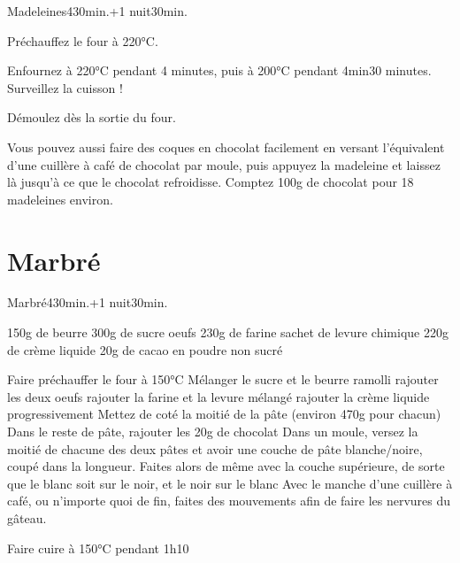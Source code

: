{\begin{recette}{Madeleines}{4}{30min.+1 nuit}{30min.}
\begin{cuisson}
Préchauffez le four à 220°C. 

Enfournez à 220°C pendant 4 minutes, puis à 200°C pendant 4min30 minutes. Surveillez la cuisson !

Démoulez dès la sortie du four.

\begin{remarque}
Vous pouvez aussi faire des coques en chocolat facilement en versant l'équivalent d'une cuillère à café de chocolat par moule, puis appuyez la madeleine et laissez là jusqu'à ce que le chocolat refroidisse. Comptez 100g de chocolat pour 18 madeleines environ.
\end{remarque}

\end{cuisson}
\end{recette}


\section{Marbré}
\begin{recette}{Marbré}{4}{30min.+1 nuit}{30min.}
\begin{ingredients}
\ingredient 150g de beurre
\ingredient 300g de sucre
 oeufs
\ingredient 230g de farine
 sachet de levure chimique
\ingredient 220g de crème liquide
\ingredient 20g de cacao en poudre non sucré
\end{ingredients}

\begin{preparation}
\etape Faire préchauffer le four à 150°C
\etape Mélanger le sucre et le beurre ramolli
\etape rajouter les deux oeufs
\etape rajouter la farine et la levure mélangé
\etape rajouter la crème liquide progressivement
\etape Mettez de coté la moitié de la pâte (environ 470g pour chacun)
\etape Dans le reste de pâte, rajouter les 20g de chocolat
\etape Dans un moule, versez la moitié de chacune des deux pâtes et avoir une couche de pâte blanche/noire, coupé dans la longueur.
\etape Faites alors de même avec la couche supérieure, de sorte que le blanc soit sur le noir, et le noir sur le blanc
\etape Avec le manche d'une cuillère à café, ou n'importe quoi de fin, faites des mouvements afin de faire les nervures du gâteau.
\end{preparation}

\begin{cuisson}
Faire cuire à 150°C pendant 1h10

\end{cuisson}
\end{recette}

}
